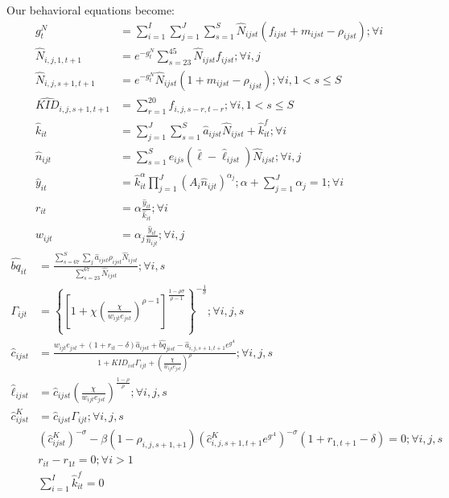 \documentclass[letterpaper,12pt]{article}
\theoremstyle{definition}
\numberwithin{equation}{section}
\begin{document}
\begin{spacing}{1.5}
	Our behavioral equations become:
	\begin{align}
		g^N_t & = \sum_{i=1}^I \sum_{j=1}^J \sum_{s=1}^S \hat N_{ijst} (f_{ijst}+m_{ijst}-\rho_{ijst}) ; \forall i \label{eq_5demo1}\\
		\hat N_{i,j,1,t+1} & = e^{-g^N_t}\sum_{s=23}^{45} \hat N_{ijst} f_{ijst} ; \forall i,j \\
		\hat N_{i,j,s+1,t+1} & = e^{-g^N_t}\hat N_{ijst} (1+m_{ijst}-\rho_{ijst}); \forall i, 1<s\le S \\
		\hat{KID}_{i,j,s+1,t+1} & = \sum_{r=1}^{20} f_{i,j,s-r,t-r}; \forall i, 1<s\le S \label{eq_5demo4}\\
		\hat k_{it} & = \sum_{j=1}^J \sum_{s=1}^S \hat a_{ijst} \hat N_{ijst} + \hat k_{it}^f; \forall i \label{eq_5ksum}\\
		\hat n_{ijt} & = \sum_{s=1}^S e_{ijs} (\bar \ell - \hat \ell_{ijst} ) \hat N_{ijst}; \forall i,j \label{eq_5nsum}\\
		\hat y_{it} & = \hat k_{it}^\alpha \prod_{j=1}^J \left( A_{i} \hat n_{ijt} \right)^{\alpha_j}; \alpha + \sum_{j=1}^J \alpha_j = 1 ; \forall i \label{eq_5yfunc} \\
		r_{it} & = \alpha \frac{\hat y_{it}}{\hat k_{it}}; \forall i \label{eq_5rfunc}\\
		w_{ijt} & = \alpha_j \frac{\hat y_{it}}{\hat n_{ijt}}; \forall i,j \label{eq_5wfunc}
	\end{align}
	\begin{align}
		\hat {bq}_{it} & = \frac{\sum_{s=67}^S \sum_j \hat a_{ijst} \rho_{ijst} \hat N_{ijst}}{\sum_{s=23}^{67} \hat N_{ijst}} ; \forall i,s \label{eq_5bqfunc}\\
		\Gamma_{ijt} & = \left\{ \left[1 + \chi \left(\frac{\chi}{w_{ijt} e_{jst}}\right)^{\rho-1}\right]^{\tfrac{1-\rho \sigma}{\rho-1}} \right\}^{-\tfrac{1}{\sigma}}; \forall i,j,s \label{eq_5HH1func}\\
    	\hat c_{ijst} & = \frac{w_{ijt} e_{jst} + (1+r_{it}-\delta)\hat a_{ijst} + \hat{bq}_{jist} - \hat a_{i,j,s+1,t+1} e^{g^A}} {1 + KID_{ist}\Gamma_{ijt} + \left(\tfrac{\chi}{w_{ijt}e_{jst}}\right)^\rho}; \forall i,j,s \\
		\hat \ell_{ijst} & = \hat c_{ijst} \left(\frac{\chi}{w_{ijt}e_{jst}}\right)^{\frac{1-\rho}{\rho}} ; \forall i,j,s \\
		\hat c^K_{ijst} & = \hat c_{ijst} \Gamma_{ijt}; \forall i,j,s \\
		& \left({\hat c^K_{ijst}}\right)^{-\sigma} - \beta (1-\rho_{i,j,s+1,+1}) \left(\hat c^K_{i,j,s+1,t+1} e^{g^A}\right)^{-\sigma}(1+r_{1,t+1}-\delta) = 0; \forall i,j,s \label{eq_5HH5func}\\
		& r_{it} - r_{1t} = 0; \forall i>1 \label{eq_5requal}\\
		& \sum_{i=1}^I \hat k^f_{it} = 0 \label{eq_5kfsum}
	\end{align}


\end{spacing}
\end{document}

